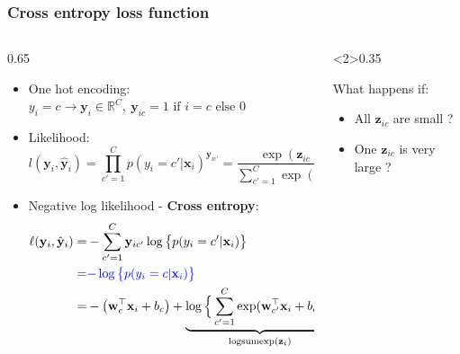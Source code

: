 \documentclass[pressentation,10pt,aspectratio=169,xcolor=table, colorlinks=true]{beamer}
\begin{document}
\begin{frame}
  \frametitle{Cross entropy loss function}
  \begin{columns}
    \begin{column}{0.65\linewidth}
      \begin{itemize}
      \item One hot encoding: \( y_i = c \rightarrow \mathbf{y}_{i} \in\mathbb{R}^C,\ \mathbf{y}_{ic}=1 \text{ if }i=c \text{ else } 0\)
      \item Likelihood:        
        \[l(\mathbf{y}_i, \hat{\mathbf{y}}_i) = \prod_{c'=1}^C p(y_i=c'|\mathbf{x}_i)^{\mathbf{y}_{ic'}} = \frac{\exp(\mathbf{z}_{ic})}{\sum_{c'=1}^C\exp(\mathbf{z}_{ic'})}\]
      \item <2-> Negative log likelihood - \textbf{Cross entropy}:
        \begin{align*}
          \ell(\mathbf{y}_i, \hat{\mathbf{y}}_i) =& - \sum_{c'=1}^C\mathbf{y}_{ic'}\log\big\{p(y_i=c'|\mathbf{x}_i)\big\} \\
                                                 =& \textcolor{blue}{-\log\big\{p(y_i=c|\mathbf{x}_i)\big\}}\\
                                                 =& - \big(\mathbf{w}_{c}^\top\mathbf{x}_i + b_{c}\big) + \underbrace{\log\Big\{\sum_{c'=1}^C\exp(\mathbf{w}_{c'}^\top\mathbf{x}_i + b_{c'})\Big\}}_{\text{logsumexp}(\mathbf{z}_i)}
        \end{align*}
      \end{itemize}
    \end{column}
    \begin{column}<2>{0.35\linewidth}
      \begin{center}
      \end{center}

      \begin{discussion}
        What happens if:
        \begin{itemize}
        \item All \(\mathbf{z}_{ic}\) are small ?
        \item One \(\mathbf{z}_{ic}\) is very large ?
        \end{itemize}
      \end{discussion}
    \end{column}
  \end{columns}

  
\end{frame}
\end{document}

